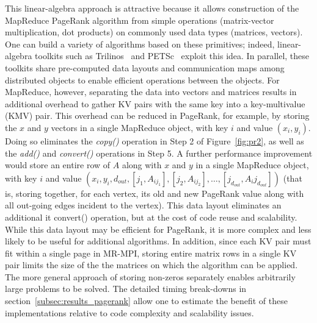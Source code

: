 This linear-algebra approach is attractive because it allows
construction of the MapReduce PageRank algorithm from simple
operations (matrix-vector multiplication, dot products) on commonly
used data types (matrices, vectors).  One can build a variety of
algorithms based on these primitives; indeed, linear-algebra toolkits
such as Trilinos~\cite{Trilinos-Overview} and
PETSc~\cite{petsc-efficient} exploit this idea.  In parallel, these
toolkits share pre-computed data layouts and communication maps among
distributed objects to enable efficient operations between the
objects.  For MapReduce, however, separating the data into vectors and
matrices results in additional overhead to gather KV pairs with the
same key into a key-multivalue (KMV) pair.  This overhead can be
reduced in PageRank, for example, by storing the $x$ and $y$ vectors
in a single MapReduce object, with key $i$ and value $(x_i, y_i)$.
Doing so eliminates the {\it copy()} operation in Step 2 of
Figure~\ref{fig:pr2}, as well as the {\it add()} and {\it convert()}
operations in Step 5.  A further performance improvement would store
an entire row of $A$ along with $x$ and $y$ in a single MapReduce
object, with key $i$ and value $(x_i, y_i, d_{out}, [j_1, A_{ij_1}],
[j_2, A_{ij_2}], \dots, [j_{d_{out}}, A_ij_{d_{out}}])$ (that is,
storing together, for each vertex, its old and new PageRank value
along with all out-going edges incident to the vertex).  This data
layout eliminates an additional {it convert()} operation, but at the
cost of code reuse and scalability.  While this data layout may be
efficient for PageRank, it is more complex and less likely to be
useful for additional algorithms.  In addition, since each KV pair
must fit within a single page in MR-MPI, storing entire matrix rows in
a single KV pair limits the size of the the matrices on which the
algorithm can be applied.  The more general approach of storing
non-zeros separately enables arbitrarily large problems to be solved.
The detailed timing break-downs in
section~\ref{subsec:results_pagerank} allow one to estimate the
benefit of these implementations relative to code complexity and
scalability issues.


